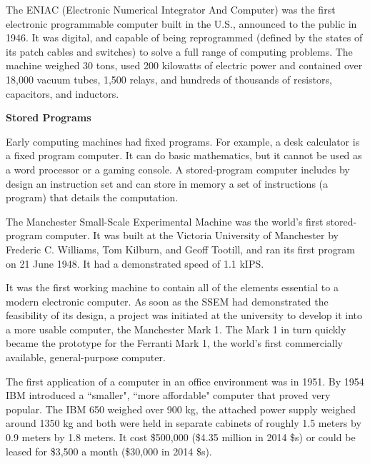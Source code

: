 \documentclass[12pt]{article}
\begin{document}
The ENIAC (Electronic Numerical Integrator And Computer) was the first electronic programmable computer built in the U.S., announced to the public in 1946. It was digital, and capable of being reprogrammed (defined by the states of its patch cables and switches) to solve a full range of computing problems. %
The machine weighed 30 tons, used 200 kilowatts of electric power and contained over 18,000 vacuum tubes, 1,500 relays, and hundreds of thousands of resistors, capacitors, and inductors.

\vspace*{2em}
\noindent \textbf{Stored Programs}

Early computing machines had fixed programs. For example, a desk calculator is a fixed program computer. It can do basic mathematics, but it cannot be used as a word processor or a gaming console. A stored-program computer includes by design an instruction set and can store in memory a set of instructions (a program) that details the computation.

The Manchester Small-Scale Experimental Machine was the world's first stored-program computer. It was built at the Victoria University of Manchester by Frederic C. Williams, Tom Kilburn, and Geoff Tootill, and ran its first program on 21 June 1948. It had a demonstrated speed of 1.1 kIPS.

It was the first working machine to contain all of the elements essential to a modern electronic computer. As soon as the SSEM had demonstrated the feasibility of its design, a project was initiated at the university to develop it into a more usable computer, the Manchester Mark 1. The Mark 1 in turn quickly became the prototype for the Ferranti Mark 1, the world's first commercially available, general-purpose computer.

The first application of a computer in an office environment was in 1951. By 1954 IBM introduced a ``smaller", ``more affordable" computer that proved very popular. The IBM 650 weighed over 900 kg, the attached power supply weighed around 1350 kg and both were held in separate cabinets of roughly 1.5 meters by 0.9 meters by 1.8 meters. It cost \$500,000 (\$4.35 million in 2014 \$s) or could be leased for \$3,500 a month (\$30,000 in 2014 \$s).
\end{document}

